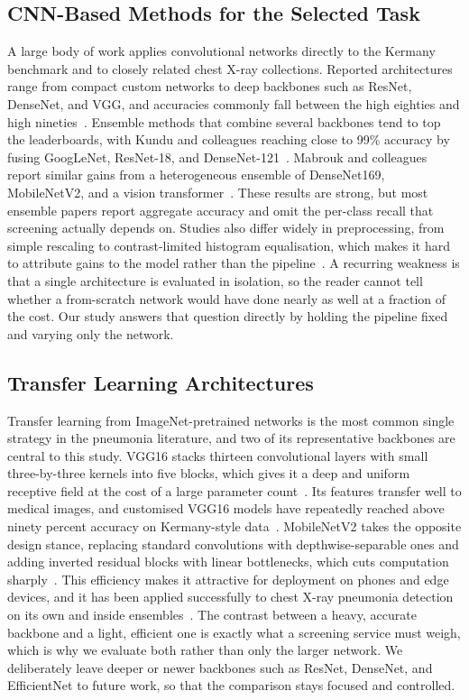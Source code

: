 \documentclass[preprint,12pt]{elsarticle}
\begin{document}
\subsection{CNN-Based Methods for the Selected Task}
A large body of work applies convolutional networks directly to the Kermany benchmark and to closely related chest X-ray collections.
Reported architectures range from compact custom networks to deep backbones such as ResNet, DenseNet, and VGG, and accuracies commonly fall between the high eighties and high nineties~\cite{hebert2025pneumonia,du2023classification}.
Ensemble methods that combine several backbones tend to top the leaderboards, with Kundu and colleagues reaching close to 99\% accuracy by fusing GoogLeNet, ResNet-18, and DenseNet-121~\cite{kundu2021pneumonia}.
Mabrouk and colleagues report similar gains from a heterogeneous ensemble of DenseNet169, MobileNetV2, and a vision transformer~\cite{mabrouk2022pneumonia}.
These results are strong, but most ensemble papers report aggregate accuracy and omit the per-class recall that screening actually depends on.
Studies also differ widely in preprocessing, from simple rescaling to contrast-limited histogram equalisation, which makes it hard to attribute gains to the model rather than the pipeline~\cite{rahman2020transfer}.
A recurring weakness is that a single architecture is evaluated in isolation, so the reader cannot tell whether a from-scratch network would have done nearly as well at a fraction of the cost.
Our study answers that question directly by holding the pipeline fixed and varying only the network.

\subsection{Transfer Learning Architectures}
Transfer learning from ImageNet-pretrained networks is the most common single strategy in the pneumonia literature, and two of its representative backbones are central to this study.
VGG16 stacks thirteen convolutional layers with small three-by-three kernels into five blocks, which gives it a deep and uniform receptive field at the cost of a large parameter count~\cite{simonyan2015very}.
Its features transfer well to medical images, and customised VGG16 models have repeatedly reached above ninety percent accuracy on Kermany-style data~\cite{ranjan2022transfer,radocaj2025optimizing}.
MobileNetV2 takes the opposite design stance, replacing standard convolutions with depthwise-separable ones and adding inverted residual blocks with linear bottlenecks, which cuts computation sharply~\cite{sandler2018mobilenetv2}.
This efficiency makes it attractive for deployment on phones and edge devices, and it has been applied successfully to chest X-ray pneumonia detection on its own and inside ensembles~\cite{alreshan2023mobilenet,mabrouk2022pneumonia}.
The contrast between a heavy, accurate backbone and a light, efficient one is exactly what a screening service must weigh, which is why we evaluate both rather than only the larger network.
We deliberately leave deeper or newer backbones such as ResNet, DenseNet, and EfficientNet to future work, so that the comparison stays focused and controlled.
\end{document}
